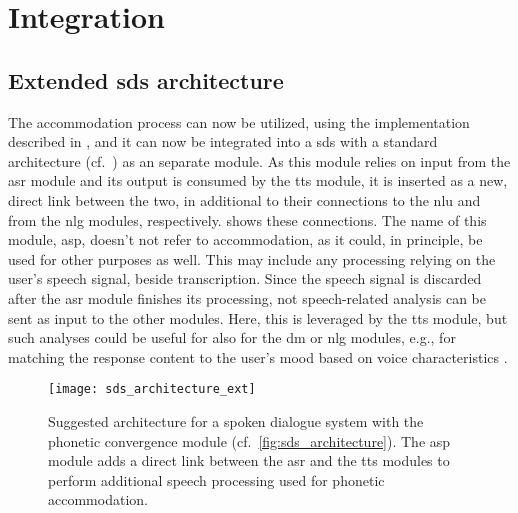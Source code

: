 
\section{Integration}
\label{sec:integration}

\subsection{Extended \acl{sds} architecture}
\label{subsec:extended_sds}

The accommodation process can now be utilized, using the implementation described in , and it can now be integrated into a \ac{sds} with a standard architecture (cf.\ ) as an separate module.
As this module relies on input from the \ac{asr} module and its output is consumed by the \ac{tts} module, it is inserted as a new, direct link between the two, in additional to their connections to the \ac{nlu} and from the \ac{nlg} modules, respectively.
 shows these connections.
The name of this module, \acf{asp}, doesn't not refer to accommodation, as it could, in principle, be used for other purposes as well.
This may include any processing relying on the user's speech signal, beside transcription.
Since the speech signal is discarded after the \ac{asr} module finishes its processing, not speech-related analysis can be sent as input to the other modules.
Here, this is leveraged by the \ac{tts} module, but such analyses could be useful for also for the \ac{dm} or \ac{nlg} modules, e.g., for matching the response content to the user's mood based on voice characteristics \citep{Braun2016assessing, Rothkrantz2004voice}.
%
\begin{figure}[t]
	\centering
	\texttt{[image: sds\_architecture\_ext]}
	\caption[Proposed extended architecture of a spoken dialogue system]
		{Suggested architecture for a spoken dialogue system with the phonetic convergence module (cf.\ \cref{fig:sds_architecture}).
		The \acs{asp} module adds a direct link between the \ac{asr} and the \ac{tts} modules to perform additional speech processing used for phonetic accommodation.}
	\label{fig:adaptation_module_architecture}
\end{figure}

